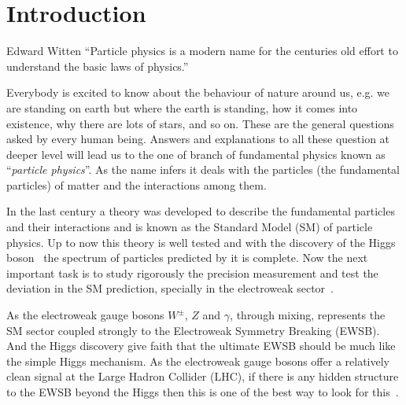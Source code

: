 \chapter{Introduction}
\begin{chapquote}
{Edward Witten}
``Particle physics is a modern name for the centuries old effort to understand the basic laws of physics.''
\end{chapquote}
%
%

Everybody is excited to know about the behaviour of nature around us, e.g. we are standing on earth but where the earth is standing, how it comes into existence, why there are lots of stars, and so on.
These are the general questions asked by every human being. Answers and explanations to all these question at deeper level will lead us to the one of branch of fundamental physics known as ``\textit{particle physics}''.
As the name infers it deals with the particles (the fundamental particles) of matter and the interactions among them.

In the last century a theory was developed to describe the fundamental particles and their interactions and is known as the Standard Model (SM) of particle physics.
Up to now this theory is well tested and with the discovery of the Higgs boson~\cite{Chatrchyan:2012xdj,Aad:2012tfa} the spectrum of particles predicted by it is complete.
Now the next important task is to study rigorously the precision measurement and test the deviation in the SM prediction, specially in the electroweak sector~\cite{Baak2013}.


As the electroweak gauge bosons $W^{\pm}$, $Z$ and $\gamma$, through mixing, represents the SM sector coupled strongly to the Electroweak Symmetry Breaking (EWSB).
And the Higgs discovery give faith that the ultimate EWSB should be much like the simple Higgs mechanism.
As the electroweak gauge bosons offer a relatively clean signal at the Large Hadron Collider (LHC), if there is any hidden structure to the EWSB beyond the Higgs then this is one of the best way to look for this~\cite{Green2017}.

